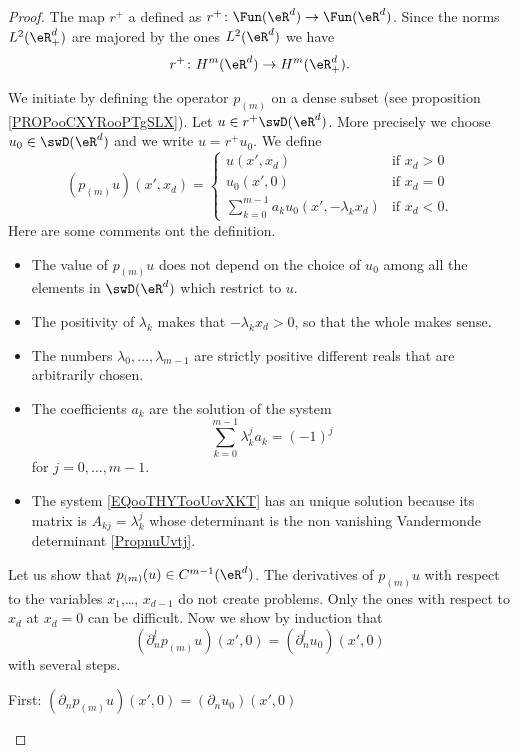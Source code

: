 \begin{proof}
    The map \( r^+\) a defined as \( r^+\colon \Fun(\eR^d)\to \Fun(\eR^d)\). Since the norms \( L^2(\eR^d_+)\) are majored by the ones \( L^2(\eR^d)\) we have
    \begin{equation}
        r^+\colon H^m(\eR^d)\to H^m(\eR^d_+).
    \end{equation}
    
    We initiate by defining the operator \( p_{(m)}\) on a dense subset (see proposition \ref{PROPooCXYRooPTgSLX}).  Let \( u\in r^+\swD(\eR^d)\). More precisely we choose \( u_0\in\swD(\eR^d)\) and we write \( u=r^+u_0\). We define
    \begin{equation}
        (p_{(m)}u)(x',x_d)=\begin{cases}
            u(x',x_d)    &   \text{if } x_d> 0\\
            u_0(x',0) & \text{if }  x_d=0\\
            \sum_{k=0}^{m-1}a_ku_0(x',-\lambda_kx_d)    &    \text{if } x_d<0.
        \end{cases}
    \end{equation}
    Here are some comments ont the definition.
    \begin{itemize}
        \item
            The value of \( p_{(m)}u\) does not depend on the choice of \( u_0\) among all the elements in \( \swD(\eR^d)\) which restrict to \( u\).
        \item 
     The positivity of \( \lambda_k\) makes that \( -\lambda_kx_d>0\), so that the whole makes sense.
 \item
    The numbers \( \lambda_0,\ldots,\lambda_{m-1}\) are strictly positive different reals that are arbitrarily chosen. 
\item
    The coefficients \( a_k\) are the solution of the system
    \begin{equation}        \label{EQooTHYTooUovXKT}
        \sum_{k=0}^{m-1}\lambda_k^ja_k=(-1)^j
    \end{equation}
    for \( j=0,\ldots, m-1\). 
    \item
        The system \eqref{EQooTHYTooUovXKT} has an unique solution because its matrix is \( A_{kj}=\lambda_k^j\) whose determinant is the non vanishing Vandermonde determinant \ref{PropnuUvtj}.
    \end{itemize}

    Let us show that \( p_{(m)}(u)\in C^{m-1}(\eR^d)\). The derivatives of \( p_{(m)}u\) with respect to the variables \( x_1\),\ldots, \( x_{d-1}\) do not create problems. Only the ones with respect to \( x_d\) at \( x_d=0\) can be difficult. Now we show by induction that 
            \begin{equation}      
                (\partial_n^lp_{(m)}u)(x',0)=(\partial_n^lu_0)(x',0)
            \end{equation}
            with several steps.
    \begin{subproof}
        \item[First: \( (\partial_np_{(m)}u)(x',0)=(\partial_nu_0)(x',0)\)]


\end{subproof}
\end{proof}

